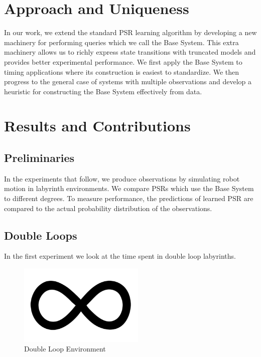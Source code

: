 \documentclass{acm_proc_article-sp}
\begin{document}
\section{Approach and Uniqueness} 

In our work, we extend the standard PSR learning algorithm by developing a new machinery for performing queries which we call the Base System. This extra machinery allows us to  richly express state transitions with truncated models and provides better experimental performance. We first apply the Base System to timing applications where its construction is easiest to standardize. We then progress to the general case of systems with multiple observations and develop a heuristic for constructing the Base System effectively from data.

\section{Results and Contributions}

\subsection{Preliminaries}
In the experiments that follow, we produce observations by simulating robot motion in labyrinth environments. We compare PSRs which use the Base System to different degrees. To measure performance, the predictions of learned PSR are compared to the actual probability distribution of the observations. 


\subsection{Double Loops}

In the first experiment we look at the time spent in double loop labyrinths. 


\begin{figure}[ht!]
\centering
\includegraphics[width=60mm]{lucasplots/doubleLoopImage.png}
\caption{Double Loop Environment\label{overflow}}
\end{figure}
\end{document}
